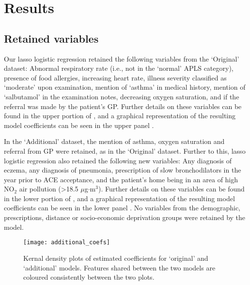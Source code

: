\section{Results}

\subsection{Retained variables}

Our lasso logistic regression retained the following variables from the `Original' dataset: Abnormal respiratory rate (i.e., not in the `normal' APLS category), presence of food allergies, increasing heart rate, illness severity classified as `moderate' upon examination, mention of `asthma' in medical history, mention of `salbutamol' in the examination notes, decreasing oxygen saturation, and if the referral was made by the patient's GP. Further details on these variables can be found in the upper portion of , and a graphical representation of the resulting model coefficients can be seen in the upper panel  .

In the `Additional' dataset, the mention of asthma, oxygen saturation and referral from GP were retained, as in the `Original' dataset. Further to this, lasso logistic regression also retained the following new variables: Any diagnosis of eczema, any diagnosis of pneumonia, prescription of slow bronchodilators in the year prior to ACE acceptance, and the patient's home being in an area of high NO$_2$ air pollution (>18.5 $\mu$g$\cdot$m$^3$). Further details on these variables can be found in the lower portion of , and a graphical representation of the resulting model coefficients can be seen in the lower panel  . No variables from the demographic, prescriptions, distance or socio-economic deprivation groups were retained by the model.



\begin{figure}[h]
    \centering
    \texttt{[image: additional\_coefs]}
    \caption[Kernal density plots of estimated coefficients for `original' and `additional' models]{Kernal density plots of estimated coefficients for `original' and `additional' models. Features shared between the two models are coloured consistently between the two plots.}
    \label{fig:additional-coefficients}
\end{figure}

